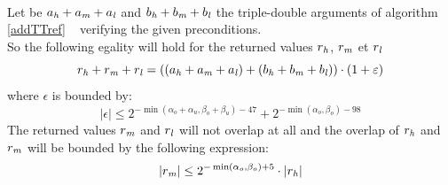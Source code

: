 \begin{theorem} ~ \\
Let be $a_{\mathit{h}} + a_{\mathit{m}} + a_{\mathit{l}}$ and $b_{\mathit{h}} + b_{\mathit{m}} + b_{\mathit{l}}$ the triple-double
arguments of algorithm \ref{addTTref} \AddTT~ verifying the given 
preconditions.\\
So the following egality will hold for the returned values $r_{\mathit{h}}$, $r_{\mathit{m}}$ et $r_{\mathit{l}}$ 
$$r_{\mathit{h}} + r_{\mathit{m}} + r_{\mathit{l}} = \left(\left(a_{\mathit{h}} + a_{\mathit{m}} + a_{\mathit{l}} \right) + \left( b_{\mathit{h}} + b_{\mathit{m}} + b_{\mathit{l}} \right)\right) \cdot \left(1 + \varepsilon\right)$$
where $\epsilon$ is bounded by:
$$\left \vert \epsilon \right \vert \leq 2^{-\min\left(\alpha_o + \alpha_u,\beta_o + \beta_u\right) - 47} + 
2^{-\min\left( \alpha_o, \beta_o\right) - 98}$$
The returned values $r_{\mathit{m}}$ and $r_{\mathit{l}}$ will not overlap at all and the
overlap of $r_{\mathit{h}}$ and $r_{\mathit{m}}$ will be bounded by the following expression:
$$\left \vert r_{\mathit{m}} \right \vert \leq 2^{-\min\left( \alpha_o, \beta_o \right) + 5} \cdot \left \vert r_{\mathit{h}} \right \vert$$
\end{theorem}

